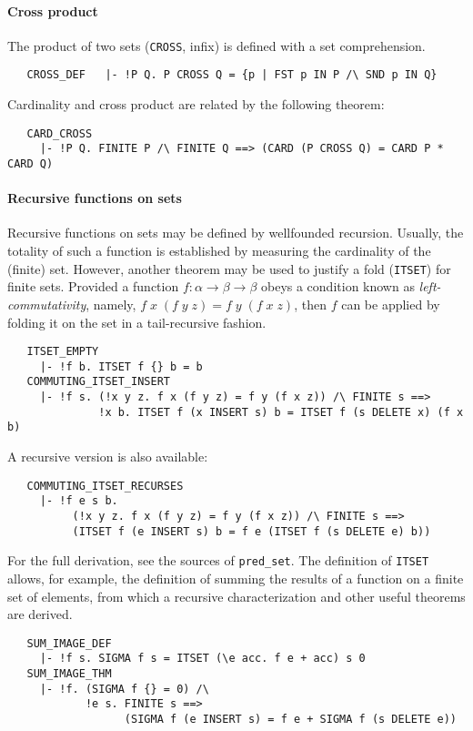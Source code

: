 \paragraph{Cross product}
The product of two sets ({\small\verb+CROSS+}, infix) is defined
with a set comprehension.
%
\begin{hol}
\begin{verbatim}
   CROSS_DEF   |- !P Q. P CROSS Q = {p | FST p IN P /\ SND p IN Q}
\end{verbatim}
\end{hol}
%
\noindent Cardinality and cross product are related by the following theorem:
\begin{hol}
\begin{verbatim}
   CARD_CROSS
     |- !P Q. FINITE P /\ FINITE Q ==> (CARD (P CROSS Q) = CARD P * CARD Q)
\end{verbatim}
\end{hol}

\paragraph{Recursive functions on sets}

Recursive functions on sets may be defined by wellfounded
recursion. Usually, the totality of such a function is established by
measuring the cardinality of the (finite) set. However, another
theorem may be used to justify a fold ({\small\verb+ITSET+}) for finite sets.
Provided a function $f:\alpha\to\beta\to\beta$ obeys a condition
known as \emph{left-commutativity}, namely, $f\;x\;(f\;y\;z) =
f\;y\;(f\;x\;z)$, then $f$ can be applied by folding it on the set
in a tail-recursive fashion.
\begin{hol}
\begin{verbatim}
   ITSET_EMPTY
     |- !f b. ITSET f {} b = b
   COMMUTING_ITSET_INSERT
     |- !f s. (!x y z. f x (f y z) = f y (f x z)) /\ FINITE s ==>
              !x b. ITSET f (x INSERT s) b = ITSET f (s DELETE x) (f x b)
\end{verbatim}
\end{hol}
A recursive version is also available:
\begin{hol}
\begin{verbatim}
   COMMUTING_ITSET_RECURSES
     |- !f e s b.
          (!x y z. f x (f y z) = f y (f x z)) /\ FINITE s ==>
          (ITSET f (e INSERT s) b = f e (ITSET f (s DELETE e) b))
\end{verbatim}
\end{hol}
For the full derivation, see the sources of {\small\verb+pred_set+}.
The definition of {\small\verb+ITSET+} allows, for example, the
definition of summing the results of a function on a finite set of
elements, from which a recursive characterization and other useful
theorems are derived.
%
\begin{hol}
\begin{verbatim}
   SUM_IMAGE_DEF
     |- !f s. SIGMA f s = ITSET (\e acc. f e + acc) s 0
   SUM_IMAGE_THM
     |- !f. (SIGMA f {} = 0) /\
            !e s. FINITE s ==>
                  (SIGMA f (e INSERT s) = f e + SIGMA f (s DELETE e))
\end{verbatim}
\end{hol}

